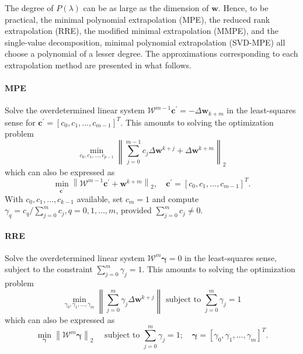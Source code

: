The degree of \(P(\lambda)\) can be as large as the dimension of \(\mathbf w\).
Hence, to be practical, the minimal polynomial extrapolation (MPE), the reduced rank extrapolation (RRE), the modified minimal extrapolation (MMPE), and the single-value decomposition, minimal polynomial extrapolation (SVD-MPE) all choose a polynomial of a lesser degree.
The approximations corresponding to each extrapolation method are presented in what follows.

\paragraph{MPE}

Solve the overdetermined linear system \(\mathscr W^{m-1} \mathbf c^{\prime}=-\Delta \mathbf w_{k+m}\) in the least-squares sense for \(\mathbf c^{\prime}=\left[c_{0}, c_{1}, \ldots, c_{m-1}\right]^{T}\).
This amounts to solving the optimization problem
\begin{equation}
\min _{c_{0}, c_{1}, \ldots, c_{p-1}}\left\|\sum_{j=0}^{m-1} c_{j} \Delta \mathbf w^ {k+j}+\Delta \mathbf w^{k+m}\right\|_2
\end{equation}
which can also be expressed as
\begin{equation}
  \min _{\mathbf c^{\prime}}\left\|\mathscr W^{m-1} \mathbf c^{\prime}+\mathbf w^{k+m}\right\|_2, \quad \mathbf c^{\prime}=\left[c_{0}, c_{1}, \ldots, c_{m-1}\right]^{T} .
\end{equation}
With \(c_{0}, c_{1}, \ldots, c_{k-1}\) available, set \(c_{m}=1\) and compute \(\gamma_{q}=c_{q} / \sum_{j=0}^{m} c_{j}, q=0,1, \ldots, m\), provided \(\sum_{j=0}^{m} c_{j} \neq 0\).

\paragraph{RRE}

Solve the overdetermined linear system \(\mathscr W^{m} \boldsymbol\gamma=0\) in the least-squares sense, subject to the constraint \(\sum_{j=0}^{m} \gamma_{j}=1\).
This amounts to solving the optimization problem
\begin{equation}
\min _{\gamma_{0}, \gamma_{1}, \ldots, \gamma_{m}}\left\|\sum_{j=0}^{m} \gamma_{j} \Delta\mathbf w^{k+j}\right\| \text { subject to } \sum_{j=0}^{m} \gamma_{j}=1
\end{equation}
which can also be expressed as
\begin{equation}
\min _{\boldsymbol\gamma}\left\|\mathscr W^{m} \boldsymbol\gamma\right\|_2 \quad \text { subject to } \sum_{j=0}^{m} \gamma_{j}=1 ; \quad \boldsymbol\gamma=\left[\gamma_{0}, \gamma_{1}, \ldots, \gamma_{m}\right]^{T} .
\end{equation}

